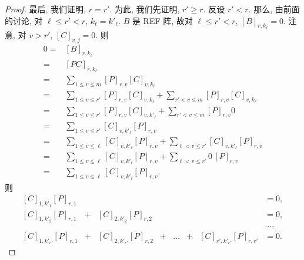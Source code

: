 \documentclass[../libro.tex]{subfiles}
\begin{document}
\begin{proof}
    最后, 我们证明, \(r = r'\).
    为此, 我们先证明, \(r' \geq r\).
    反设 \(r' < r\).
    那么, 由前面的讨论, 对 \(\ell \leq r' < r\),
    \(k_\ell = k'_\ell\).
    \(B\) 是 REF 阵,
    故对 \(\ell \leq r' < r\),
    \([B]_{r,k_\ell} = 0\).
    注意, 对 \(v > r'\),
    \([C]_{v,j} = 0\).
    则
    \begin{align*}
        0
        = {} &
        [B]_{r,k_\ell}
        \\
        = {} &
        [P C]_{r,k_\ell}
        \\
        = {} &
        \sum_{1 \leq v \leq m}
        {[P]_{r,v} [C]_{v,k_\ell}}
        \\
        = {} &
        \sum_{1 \leq v \leq r'}
        {[P]_{r,v} [C]_{v,k_\ell}}
        +
        \sum_{r' < v \leq m}
        {[P]_{r,v} [C]_{v,k_\ell}}
        \\
        = {} &
        \sum_{1 \leq v \leq r'}
        {[P]_{r,v} [C]_{v,k'_\ell}}
        +
        \sum_{r' < v \leq m}
        {[P]_{r,v} 0}
        \\
        = {} &
        \sum_{1 \leq v \leq r'}
        {[C]_{v,k'_\ell} [P]_{r,v}}
        \\
        = {} &
        \sum_{1 \leq v \leq \ell}
        {[C]_{v,k'_\ell} [P]_{r,v}}
        +
        \sum_{\ell < v \leq r'}
        {[C]_{v,k'_\ell} [P]_{r,v}}
        \\
        = {} &
        \sum_{1 \leq v \leq \ell}
        {[C]_{v,k'_\ell} [P]_{r,v}}
        +
        \sum_{\ell < v \leq r'}
        {0\, [P]_{r,v}}
        \\
        = {} &
        \sum_{1 \leq v \leq \ell}
        {[C]_{v,k'_\ell} [P]_{r,v}}.
    \end{align*}
    则
    \begin{equation*}
        \begin{alignedat}{7}
            [C]_{1,k'_1} [P]_{r,1}    &         &                           &         &       &         &                             & {} = 0, \\
            [C]_{1,k'_2} [P]_{r,1}    & {} + {} & [C]_{2,k'_2} [P]_{r,2}    &         &       &         &                             & {} = 0, \\
            {}                        &         &                           &         &       &         &                             & \dots,  \\
            [C]_{1,k'_{r'}} [P]_{r,1} & {} + {} & [C]_{2,k'_{r'}} [P]_{r,2} & {} + {} & \dots & {} + {} & [C]_{r',k'_{r'}} [P]_{r,r'} & {} = 0.

\end{alignedat}
\end{equation*}
\end{proof}
\end{document}
